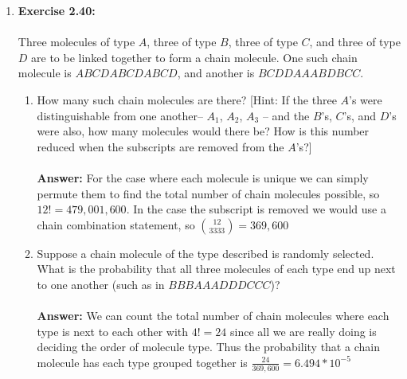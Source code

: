 \documentclass[12pt]{article}
\theoremstyle{homework}
\begin{document}
\begin{enumerate}
\item\hspace{.5in}\textbf{Exercise 2.40:} \\
\\
Three molecules of type $A$, three of type $B$, three of type $C$, and three of type $D$ are to be linked together to form a chain molecule. One such chain molecule is $ABCDABCDABCD$, and another is $BCDDAAABDBCC$.
\begin{enumerate}
\item How many such chain molecules are there? [Hint: If the three $A$’s were distinguishable from one another-- $A_1$, $A_2$, $A_3$ -- and the $B$’s, $C$’s, and $D$’s were also, how many molecules would there be? How is this number reduced when the subscripts are removed from the $A$’s?]\\
\\
 \textbf{Answer:} For the case where each molecule is unique we can simply permute them to find the total number of chain molecules possible, so $12! = 479,001,600$. In the case the subscript is removed we would use a chain combination statement, so $ {12 \choose 3 3 3 3}  = 369,600$
 \\
\item Suppose a chain molecule of the type described is randomly selected. What is the probability that all three molecules of each type end up next to one another (such as in $BBBAAADDDCCC$)?\\
\\
 \textbf{Answer:} We can count the total number of chain molecules where each type is next to each other with $4! = 24$ since all we are really doing is deciding the order of molecule type. Thus the probability that a chain molecule has each type grouped together is $\frac{24}{369,600} = 6.494 *10^{-5}$
 \\
\end{enumerate}
\vspace{1in}



\end{enumerate}
\end{document}
